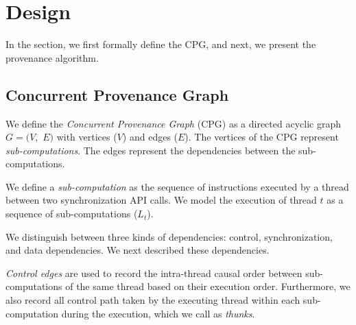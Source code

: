\section{Design}
\label{sec:algorithms}
In the section, we first formally define the CPG, and next, we present the provenance algorithm.

\subsection{Concurrent Provenance Graph}  We define the {\em
Concurrent Provenance Graph} (CPG)  as a directed acyclic graph $G =
(V,$ $E)$ with vertices ($V$) and edges ($E$). The
vertices of the CPG represent {\em sub-computations}. The edges represent the dependencies between the sub-computations. %

 We define a {\em sub-computation}  as the sequence of instructions
executed by a thread between two \pthreads synchronization API calls. We model the execution of thread $t$ as a sequence of sub-computations
($L_t$). 


 We distinguish between three kinds of dependencies: control, synchronization, and data dependencies. We next described these dependencies.



 

 {\em Control edges}  are used to record the intra-thread causal order between sub-computations of the same thread
based on their execution order. Furthermore, we also record all control path taken by the executing thread within each sub-computation during the execution, which we call as {\em thunks}.  

